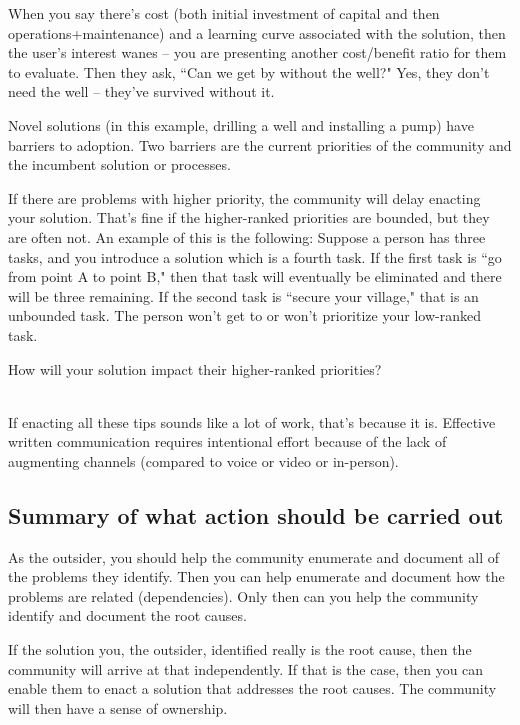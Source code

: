 When you say there's cost (both initial investment of capital and then operations+maintenance) and a learning curve associated with the solution, then the user's interest wanes -- you are presenting another cost/benefit ratio for them to evaluate. Then they ask, ``Can we get by without the well?" Yes, they don't need the well -- they've survived without it.

Novel solutions (in this example, drilling a well and installing a pump) have barriers to adoption. Two barriers are the current priorities of the community and the incumbent solution or processes.

If there are problems with higher priority, the community will delay enacting your solution. That's fine if the higher-ranked priorities are bounded, but they are often not. An example of this is the following:
Suppose a person has three tasks, and you introduce a solution which is a fourth task.
If the first task is ``go from point A to point B," then that task will eventually be eliminated and there will be three remaining.
If the second task is ``secure your village," that is an unbounded task. The person won't get to or won't prioritize your low-ranked task.

How will your solution impact their higher-ranked priorities?

\ \\

If enacting all these tips sounds like a lot of work, that's because it is. Effective written communication requires intentional effort because of the lack of augmenting channels (compared to voice or video or in-person). 




\subsection*{Summary of what action should be carried out} 

As the outsider, you should help the community enumerate and document all of the problems they identify. Then you can help enumerate and document how the problems are related (dependencies). Only then can you help the community identify and document the root causes.

If the solution you, the outsider, identified really is the root cause, then the community will arrive at that independently. If that is the case, then you can enable them to enact a solution that addresses the root causes. The community will then have a sense of ownership.
